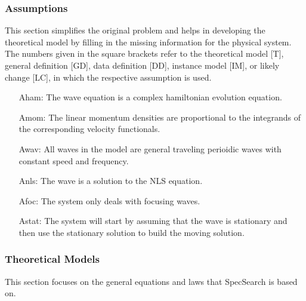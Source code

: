 \documentclass[12pt]{article}
\begin{document}
\subsubsection{Assumptions}

This section simplifies the original problem and helps in developing the
theoretical model by filling in the missing information for the physical
system. The numbers given in the square brackets refer to the theoretical model
[T], general definition [GD], data definition [DD], instance model [IM], or
likely change [LC], in which the respective assumption is used.

\begin{itemize}[leftmargin=.5in]

\item[Aham:]The 
wave equation is a complex hamiltonian evolution equation. 
\item[Amom:]The 
linear momentum densities are proportional to the integrands of the 
corresponding velocity functionals.
\item[Awav:]All 
waves in the model are general traveling perioidic waves with constant speed 
and frequency. 
\item[Anls:]The 
wave is a solution to the NLS equation.
\item[Afoc:]The 
system only deals with focusing waves.
\item[Astat:] The system will start by assuming that the wave is stationary and 
then use 
the stationary solution to build the moving solution.

\end{itemize}


\subsubsection{Theoretical Models}\label{sec_theoretical}

This section focuses on the general equations and laws that SpecSearch is based
on. 
~\newline
\end{document}
